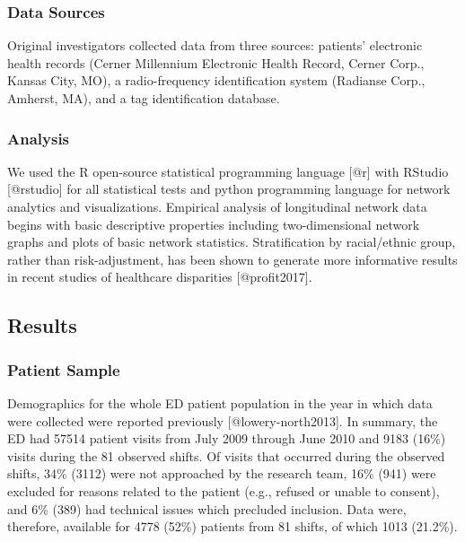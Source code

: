 \documentclass[
]{article}
\begin{document}
\hypertarget{data-sources}{%
\subsubsection{Data Sources}\label{data-sources}}

Original investigators collected data from three sources: patients'
electronic health records (Cerner Millennium Electronic Health Record,
Cerner Corp., Kansas City, MO), a radio-frequency identification system
(Radianse Corp., Amherst, MA), and a tag identification database.

\hypertarget{analysis}{%
\subsubsection{Analysis}\label{analysis}}

We used the R open-source statistical programming language {[}@r{]} with
RStudio {[}@rstudio{]} for all statistical tests and python programming
language for network analytics and visualizations. Empirical analysis of
longitudinal network data begins with basic descriptive properties
including two-dimensional network graphs and plots of basic network
statistics. Stratification by racial/ethnic group, rather than
risk-adjustment, has been shown to generate more informative results in
recent studies of healthcare disparities {[}@profit2017{]}.

\hypertarget{results}{%
\subsection{Results}\label{results}}

\hypertarget{patient-sample}{%
\subsubsection{Patient Sample}\label{patient-sample}}

Demographics for the whole ED patient population in the year in which
data were collected were reported previously {[}@lowery-north2013{]}. In
summary, the ED had 57514 patient visits from July 2009 through June
2010 and 9183 (16\%) visits during the 81 observed shifts. Of visits
that occurred during the observed shifts, 34\% (3112) were not
approached by the research team, 16\% (941) were excluded for reasons
related to the patient (e.g., refused or unable to consent), and 6\%
(389) had technical issues which precluded inclusion. Data were,
therefore, available for 4778 (52\%) patients from 81 shifts, of which
1013 (21.2\%).
\end{document}
